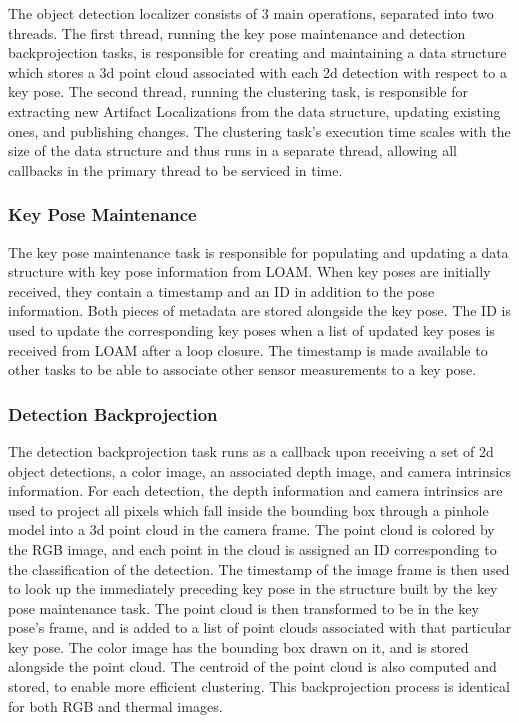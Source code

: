 The object detection localizer consists of 3 main operations, separated into two threads. The first thread, running the key pose maintenance and detection backprojection tasks, is responsible for creating and maintaining a data structure which stores a 3d point cloud associated with each 2d detection with respect to a key pose. The second thread, running the clustering task, is responsible for extracting new Artifact Localizations from the data structure, updating existing ones, and publishing changes. The clustering task's execution time scales with the size of the data structure and thus runs in a separate thread, allowing all callbacks in the primary thread to be serviced in time.

\subsubsection{Key Pose Maintenance}

The key pose maintenance task is responsible for populating and updating a data structure with key pose information from LOAM. When key poses are initially received, they contain a timestamp and an ID in addition to the pose information. Both pieces of metadata are stored alongside the key pose. The ID is used to update the corresponding key poses when a list of updated key poses is received from LOAM after a loop closure. The timestamp is made available to other tasks to be able to associate other sensor measurements to a key pose.
	
\subsubsection{Detection Backprojection}
The detection backprojection task runs as a callback upon receiving a set of 2d object detections, a color image, an associated depth image, and camera intrinsics information. For each detection, the depth information and camera intrinsics are used to project all pixels which fall inside the bounding box through a pinhole model into a 3d point cloud in the camera frame. The point cloud is colored by the RGB image, and each point in the cloud is assigned an ID corresponding to the classification of the detection. The timestamp of the image frame is then used to look up the immediately preceding key pose in the structure built by the key pose maintenance task. The point cloud is then transformed to be in the key pose's frame, and is added to a list of point clouds associated with that particular key pose. The color image has the bounding box drawn on it, and is stored alongside the point cloud. The centroid of the point cloud is also computed and stored, to enable more efficient clustering. This backprojection process is identical for both RGB and thermal images.
	
